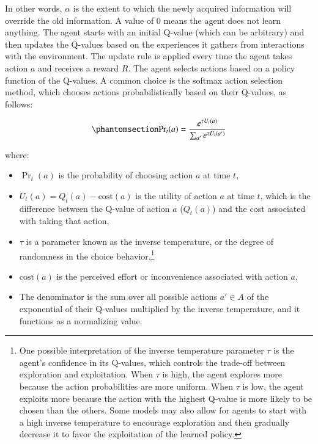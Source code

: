 \documentclass[
  number,
  preprint,
  3p,
  onecolumn]{elsarticle}
\begin{document}
In other words, \(\alpha\) is the extent to which the newly acquired
information will override the old information. A value of 0 means the
agent does not learn anything. The agent starts with an initial Q-value
(which can be arbitrary) and then updates the Q-values based on the
experiences it gathers from interactions with the environment. The
update rule is applied every time the agent takes action \(a\) and
receives a reward \(R\). The agent selects actions based on a policy
function of the Q-values. A common choice is the softmax action
selection method, which chooses actions probabilistically based on their
Q-values, as follows:

\begin{equation}\phantomsection\label{eq-softmax}{
\text{Pr}_t(a) = \frac{e^{\tau U_t(a)}}{\sum_{a'} e^{\tau U_t(a')}}
}\end{equation}

where:

\begin{itemize}
\item
  \(\Pr_t(a)\) is the probability of choosing action \(a\) at time
  \(t\),
\item
  \(U_t(a) = Q_t(a) - \text{cost}(a)\) is the utility of action \(a\) at
  time \(t\), which is the difference between the Q-value of action
  \(a\) (\(Q_t(a)\)) and the cost associated with taking that action,
\item
  \(\tau\) is a parameter known as the inverse temperature, or the
  degree of randomness in the choice behavior,\footnote{One possible
    interpretation of the inverse temperature parameter \(\tau\) is the
    agent's confidence in its Q-values, which controls the trade-off
    between exploration and exploitation. When \(\tau\) is high, the
    agent explores more because the action probabilities are more
    uniform. When \(\tau\) is low, the agent exploits more because the
    action with the highest Q-value is more likely to be chosen than the
    others. Some models may also allow for agents to start with a high
    inverse temperature to encourage exploration and then gradually
    decrease it to favor the exploitation of the learned policy.}
\item
  \(\text{cost}(a)\) is the perceived effort or inconvenience associated
  with action \(a\),
\item
  The denominator is the sum over all possible actions \(a' \in A\) of
  the exponential of their Q-values multiplied by the inverse
  temperature, and it functions as a normalizing value.
\end{itemize}
\end{document}
